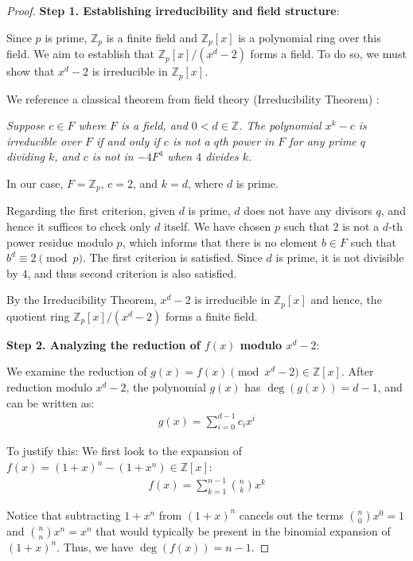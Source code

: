 \documentclass{article}
\theoremstyle{plain}
\theoremstyle{definition}
\begin{document}
\begin{proof}
\textbf{Step 1. Establishing irreducibility and field structure}:

Since $p$ is prime, $\mathbb{Z}_p$ is a finite field and $\mathbb{Z}_p[x]$ is a polynomial ring over this field. We aim to establish that $\mathbb{Z}_p[x]/(x^d - 2)$ forms a field. To do so, we must show that $x^d - 2$ is irreducible in $\mathbb{Z}_p[x]$.

We reference a classical theorem from field theory (Irreducibility Theorem) \cite{karpilovsky1989fields}:

\textit{Suppose $c \in F$ where $F$ is a field, and $0 < d \in \mathbb{Z}$. The polynomial $x^k - c$ is irreducible over $F$ if and only if $c$ is not a $q$th power in $F$ for any prime $q$ dividing $k$, and $c$ is not in $-4F^4$ when $4$ divides $k$.}

In our case, $F = \mathbb{Z}_p$, $c = 2$, and $k = d$, where $d$ is prime.

Regarding the first criterion, given $d$ is prime, $d$ does not have any divisors $q$, and hence it suffices to check only $d$ itself. We have chosen $p$ such that $2$ is not a $d$-th power residue modulo $p$, which informs that there is no element $b \in F$ such that $b^d \equiv 2 \pmod{p}$. The first criterion is satisfied. Since $d$ is prime, it is not divisible by $4$, and thus second criterion is also satisfied.

By the Irreducibility Theorem, $x^d - 2$ is irreducible in $\mathbb{Z}_p[x]$ and hence, the quotient ring $\mathbb{Z}_p[x]/(x^d - 2)$ forms a finite field.

\textbf{Step 2. Analyzing the reduction of $f(x)$ modulo $x^d - 2$}:

We examine the reduction of $g(x) = f(x) \pmod{x^d - 2} \in \mathbb{Z}[x]$. After reduction modulo $x^d - 2$, the polynomial $g(x)$ has $\deg(g(x)) = d-1$, and can be written as:
\begin{align}
    g(x) = \sum_{i=0}^{d-1} c_i x^i
\end{align}

To justify this: We first look to the expansion of  $f(x) = (1 + x)^n - (1 + x^n) \in \mathbb{Z}[x]$:
\begin{align}
    f(x) = \sum_{k=1}^{n-1} \binom{n}{k} x^k
\end{align}

Notice that subtracting $1+x^n$ from $(1+x)^n$ cancels out the terms $\binom{n}{0} x^0 = 1$ and $\binom{n}{n} x^n = x^n$ that would typically be present in the binomial expansion of $(1+x)^n$. Thus, we have $\deg(f(x))=n-1$.


\end{proof}
\end{document}
